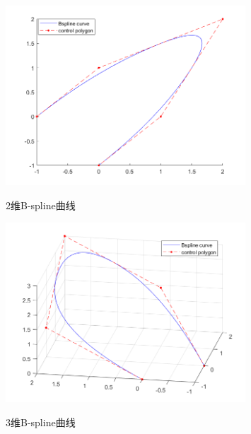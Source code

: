 \documentclass[utf8]{ctexart}
\begin{document}
\begin{itemize}
    \begin{figure}[H]
        \centering
        \includegraphics[width=0.8\textwidth]{bspline_2d_2.png}
        \label{fig: bspline_2d_2}
        \caption{2维B-spline曲线}
    \end{figure}
    \begin{figure}[H]
        \centering
        \includegraphics[width=0.8\textwidth]{bspline_3d_2.png}
        \label{fig: bspline_3d_2}
        \caption{3维B-spline曲线}
    \end{figure}
\end{itemize}
\end{document}
